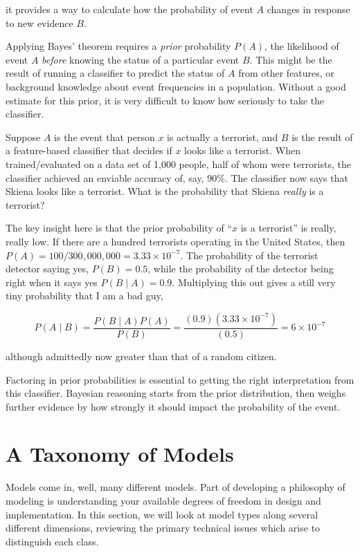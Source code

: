 \documentclass[10pt]{article}
\begin{document}
it provides a way to calculate how the probability of event \(A\) changes in response to new evidence \(B\).

Applying Bayes’ theorem requires a \textit{prior} probability \(P(A)\), the likelihood of event \(A\) \textit{before} knowing the status of a particular event \(B\). This might be the result of running a classifier to predict the status of \(A\) from other features, or background knowledge about event frequencies in a population. Without a good estimate for this prior, it is very difficult to know how seriously to take the classifier.

Suppose \(A\) is the event that person \(x\) is actually a terrorist, and \(B\) is the result of a feature-based classifier that decides if \(x\) looks like a terrorist. When trained/evaluated on a data set of 1,000 people, half of whom were terrorists, the classifier achieved an enviable accuracy of, say, 90\%. The classifier now says that Skiena looks like a terrorist. What is the probability that Skiena \textit{really} is a terrorist?

The key insight here is that the prior probability of “\(x\) is a terrorist” is really, really low. If there are a hundred terrorists operating in the United States, then \(P(A)=100/300,000,000=3.33\times 10^{-7}\). The probability of the terrorist detector saying yes, \(P(B)=0.5\), while the probability of the detector being right when it says yes \(P(B \mid A)=0.9\). Multiplying this out gives a still very tiny probability that I am a bad guy,

\[
P(A \mid B)=\frac{P(B \mid A) P(A)}{P(B)}=\frac{(0.9)(3.33 \times 10^{-7})}{(0.5)}=6 \times 10^{-7}
\]

although admittedly now greater than that of a random citizen.

Factoring in prior probabilities is essential to getting the right interpretation from this classifier. Bayesian reasoning starts from the prior distribution, then weighs further evidence by how strongly it should impact the probability of the event.

\section{A Taxonomy of Models}

Models come in, well, many different models. Part of developing a philosophy of modeling is understanding your available degrees of freedom in design and implementation. In this section, we will look at model types along several different dimensions, reviewing the primary technical issues which arise to distinguish each class.
\end{document}
